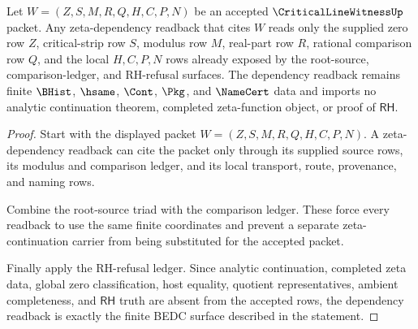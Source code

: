 \begin{theorem}
\label{thm:critical-line-witness-zeta-dependency-readback}
Let $W=(Z,S,M,R,Q,H,C,P,N)$ be an accepted $\CriticalLineWitnessUp$ packet. Any zeta-dependency readback that cites $W$ reads only the supplied zero row $Z$, critical-strip row $S$, modulus row $M$, real-part row $R$, rational comparison row $Q$, and the local $H,C,P,N$ rows already exposed by the root-source, comparison-ledger, and RH-refusal surfaces. The dependency readback remains finite $\BHist$, $\hsame$, $\Cont$, $\Pkg$, and $\NameCert$ data and imports no analytic continuation theorem, completed zeta-function object, or proof of $\mathsf{RH}$.
\end{theorem}
\begin{proof}
Start with the displayed packet $W=(Z,S,M,R,Q,H,C,P,N)$. A zeta-dependency readback can cite the packet only through its supplied source rows, its modulus and comparison ledger, and its local transport, route, provenance, and naming rows.

Combine the root-source triad with the comparison ledger. These force every readback to use the same finite coordinates and prevent a separate zeta-continuation carrier from being substituted for the accepted packet.

Finally apply the RH-refusal ledger. Since analytic continuation, completed zeta data, global zero classification, host equality, quotient representatives, ambient completeness, and $\mathsf{RH}$ truth are absent from the accepted rows, the dependency readback is exactly the finite BEDC surface described in the statement.
\end{proof}
